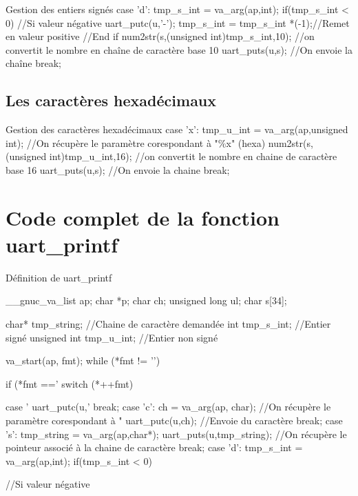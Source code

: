 {\begin{Cpp}{Gestion des entiers signés}
    case 'd':
	    tmp_s_int = va_arg(ap,int);
		if(tmp_s_int < 0) { //Si valeur négative
			uart_putc(u,'-'); 
			tmp_s_int = tmp_s_int *(-1);//Remet en valeur positive
		}//End if
		num2str(s,(unsigned int)tmp_s_int,10);	//on convertit le nombre en chaîne de caractère base 10
		uart_puts(u,s);						//On envoie la chaîne
		break;
\end{Cpp}

\subsection{Les caractères hexadécimaux}

\begin{Cpp}{Gestion des caractères hexadécimaux}
	case 'x':
	    tmp_u_int = va_arg(ap,unsigned int);	//On récupère le paramètre corespondant à "\%x" (hexa)
		num2str(s,(unsigned int)tmp_u_int,16);	//on convertit le nombre en chaine de caractère base 16
		uart_puts(u,s);							//On envoie la chaine
		break;
\end{Cpp}

\section{Code complet de la fonction uart\_printf}


\begin{Cpp}{Définition de uart\_printf}

	__gnuc_va_list ap;
	char          *p;
	char           ch;
	unsigned long  ul;
	char           s[34];

	char* tmp_string;		//Chaine de caractère demandée
	int tmp_s_int;			//Entier signé
	unsigned int tmp_u_int; //Entier non signé
	
	va_start(ap, fmt);
	while (*fmt != '\0') {
		if (*fmt =='%
			switch (*++fmt) {
				case '%
					uart_putc(u,'%
					break;
				case 'c':
					ch = va_arg(ap, char);  	//On récupère le paramètre corespondant à "%
					uart_putc(u,ch); 			//Envoie du caractère
					break;
				case 's':
					tmp_string = va_arg(ap,char*);
					uart_puts(u,tmp_string); //On récupère le pointeur associé à la chaine de caractère
					break;
				case 'd':
					tmp_s_int = va_arg(ap,int);
					if(tmp_s_int < 0) { //Si valeur négative
						
}}}
\end{Cpp}}
